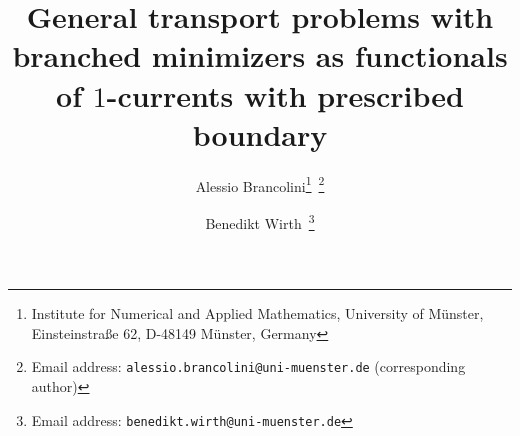 \documentclass[10pt,a4paper,oneside,final]{article}
\newcommand{\flux}{{\mathcal{F}}}
\numberwithin{equation}{section}
\theoremstyle{plain}
\theoremstyle{definition}
\theoremstyle{remark}
\begin{document}
\title{General transport problems with branched minimizers as functionals of $1$-currents with prescribed boundary}
\author{Alessio Brancolini\footnote{Institute for Numerical and Applied Mathematics, University of M\"unster, Einsteinstra\ss{}e 62, D-48149 M\"unster, Germany}\ \footnote{Email address: \texttt{alessio.brancolini@uni-muenster.de} (corresponding author)} \and Benedikt Wirth\footnotemark[1]\ \footnote{Email address: \texttt{benedikt.wirth@uni-muenster.de}}}
\maketitle
\end{document}
